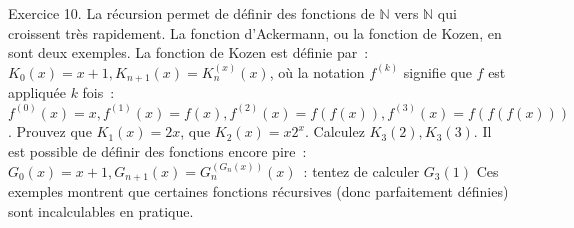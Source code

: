 \documentclass[a4paper]{article}
\def\N{\mathbb{N}}
\begin{document}
Exercice 10. La r\'ecursion permet de d\'efinir des fonctions de $\N$ vers $\N$ qui croissent tr\`es rapidement. La fonction d'Ackermann, ou la fonction de Kozen, en sont deux exemples.
La fonction de Kozen est d\'efinie par~: $K_0(x)=x+1, K_{n+1}(x)=K_n^{(x)}(x)$, o\`u
la notation $f^{(k)}$ signifie que $f$ est appliqu\'ee $k$ fois~: $f^{(0)}(x)=x, f^{(1)}(x)=f(x), f^{(2)}(x)=f( f( x)), f^{(3)}(x)=f( f( f( x)))$. Prouvez que $K_1(x)=2x$, que $K_2(x)=x2^x$. Calculez $K_3(2), K_3(3)$. 
Il est possible de d\'efinir des fonctions encore pire~: $G_0(x)=x+1, G_{n+1}(x)=G_n^{(G_n(x))}(x)$~: tentez de calculer $G_3(1)$ 
Ces exemples montrent que certaines fonctions r\'ecursives (donc parfaitement d\'efinies) sont incalculables en pratique.
\end{document}
